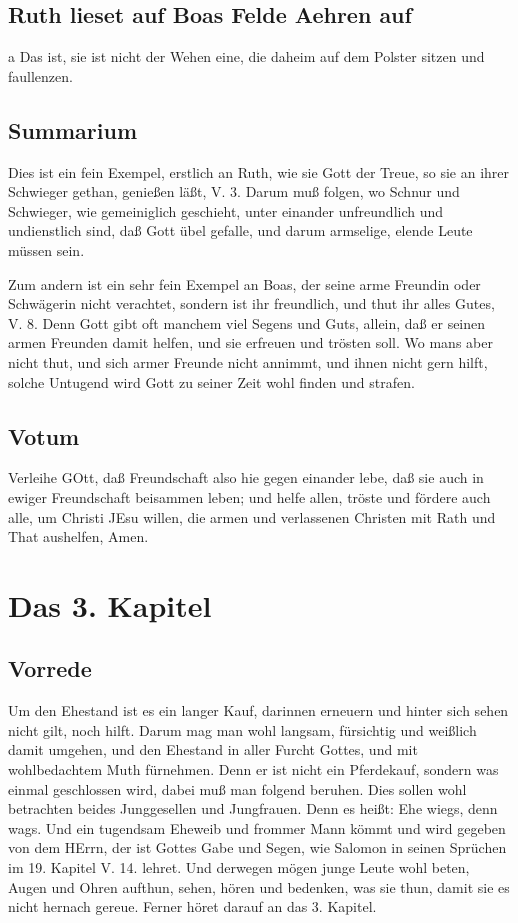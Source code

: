 \section{Ruth lieset auf Boas Felde Aehren auf}

a Das ist, sie ist nicht der Wehen eine, die daheim auf dem Polster sitzen und faullenzen.
\section{Summarium}

Dies ist ein fein Exempel, erstlich an Ruth, wie sie Gott der Treue, so sie an ihrer Schwieger gethan, genießen läßt, V. 3. Darum muß folgen, wo Schnur und Schwieger, wie gemeiniglich geschieht, unter einander unfreundlich und undienstlich sind, daß Gott übel gefalle, und darum armselige, elende Leute müssen sein.

Zum andern ist ein sehr fein Exempel an Boas, der seine arme Freundin oder Schwägerin nicht verachtet, sondern ist ihr freundlich, und thut ihr alles Gutes, V. 8. Denn Gott gibt oft manchem viel Segens und Guts, allein, daß er seinen armen Freunden damit helfen, und sie erfreuen und trösten soll. Wo mans aber nicht thut, und sich armer Freunde nicht annimmt, und ihnen nicht gern hilft, solche Untugend wird Gott zu seiner Zeit wohl finden und strafen.

\section{Votum}

Verleihe GOtt, daß Freundschaft also hie gegen einander lebe, daß sie auch in ewiger Freundschaft beisammen leben; und helfe allen, tröste und fördere auch alle, um Christi JEsu willen, die armen und verlassenen Christen mit Rath und That aushelfen, Amen.

\chapter{Das 3. Kapitel}

\section{Vorrede}

Um den Ehestand ist es ein langer Kauf, darinnen erneuern und hinter sich sehen nicht gilt, noch hilft. Darum mag man wohl langsam, fürsichtig und weißlich damit umgehen, und den Ehestand in aller Furcht Gottes, und mit wohlbedachtem Muth fürnehmen. Denn er ist nicht ein Pferdekauf, sondern was einmal geschlossen wird, dabei muß man folgend beruhen. Dies sollen wohl betrachten beides Junggesellen und Jungfrauen. Denn es heißt: Ehe wiegs, denn wags. Und ein tugendsam Eheweib und frommer Mann kömmt und wird gegeben von dem HErrn, der ist Gottes Gabe und Segen, wie Salomon in seinen Sprüchen im 19. Kapitel V. 14. lehret. Und derwegen mögen junge Leute wohl beten, Augen und Ohren aufthun, sehen, hören und bedenken, was sie thun, damit sie es nicht hernach gereue. Ferner höret darauf an das 3. Kapitel.


